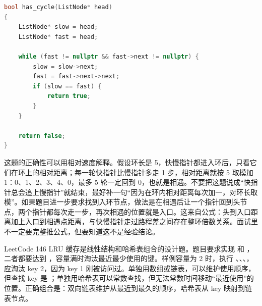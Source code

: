 \begin{lstlisting}[language=C++,caption={LeetCode 141 环形链表：快慢指针检测相遇}]
bool has_cycle(ListNode* head)
{
    ListNode* slow = head;
    ListNode* fast = head;

    while (fast != nullptr && fast->next != nullptr) {
        slow = slow->next;
        fast = fast->next->next;
        if (slow == fast) {
            return true;
        }
    }

    return false;
}
\end{lstlisting}

这题的正确性可以用相对速度解释。假设环长是 5，快慢指针都进入环后，只看它们在环上的相对距离；每一轮快指针比慢指针多走 1 步，相对距离就按 5 取模加 1：0、1、2、3、4、0，最多 5 轮一定回到 0，也就是相遇。不要把这题说成“快指针总会追上慢指针”就结束，最好补一句“因为在环内相对距离每次加一，对环长取模”。如果题目进一步要求找到入环节点，做法是在相遇后让一个指针回到头节点，两个指针都每次走一步，再次相遇的位置就是入口。这来自公式：头到入口距离加上入口到相遇点距离，与快慢指针走过路程差之间存在整环倍数关系。面试里不一定要完整推公式，但要知道这不是经验结论。

LeetCode 146 LRU 缓存是线性结构和哈希表组合的设计题。题目要求实现  和 ，二者都要达到 ，容量满时淘汰最近最少使用的键。样例容量为 2 时，执行 、、、，应淘汰 key 2，因为 key 1 刚被访问过。单独用数组或链表，可以维护使用顺序，但查找 key 是 ；单独用哈希表可以常数查找，但无法常数时间移动“最近使用”的位置。正确组合是：双向链表维护从最近到最久的顺序，哈希表从 key 映射到链表节点。

